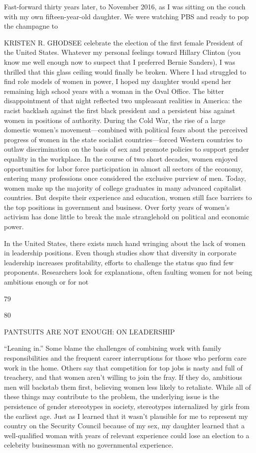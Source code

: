  \par 
Fast-forward thirty years later, to November 2016, as I was sitting on the couch with my own fifteen-year-old daughter. We were watching PBS and ready to pop the champagne to
 \par 
KRISTEN R. GHODSEE celebrate the election of the first female President of the United States. Whatever my personal feelings toward Hillary Clinton (you know me well enough now to suspect that I preferred Bernie Sanders), I was thrilled that this glass ceiling would finally be broken. Where I had struggled to find role models of women in power, I hoped my daughter would spend her remaining high school years with a woman in the Oval Office. The bitter disappointment of that night reflected two unpleasant realities in America: the racist backlash against the first black president and a persistent bias against women in positions of authority. During the Cold War, the rise of a large domestic women’s movement—combined with political fears about the perceived progress of women in the state socialist countries—forced Western countries to outlaw discrimination on the basis of sex and promote policies to support gender equality in the workplace. In the course of two short decades, women enjoyed opportunities for labor force participation in almost all sectors of the economy, entering many professions once considered the exclusive purview of men. Today, women make up the majority of college graduates in many advanced capitalist countries. But despite their experience and education, women still face barriers to the top positions in government and business. Over forty years of women’s activism has done little to break the male stranglehold on political and economic power.
 \par 
In the United States, there exists much hand wringing about the lack of women in leadership positions. Even though studies show that diversity in corporate leadership increases profitability, efforts to challenge the status quo find few proponents. Researchers look for explanations, often faulting women for not being ambitious enough or for not
 \par 
79
 \par 
80
 \par 
PANTSUITS ARE NOT ENOUGH: ON LEADERSHIP
 \par 
“Leaning in.” Some blame the challenges of combining work with family responsibilities and the frequent career interruptions for those who perform care work in the home. Others say that competition for top jobs is nasty and full of treachery, and that women aren't willing to join the fray. If they do, ambitious men will backstab them first, believing women less likely to retaliate. While all of these things may contribute to the problem, the underlying issue is the persistence of gender stereotypes in society, stereotypes internalized by girls from the earliest age. Just as I learned that it wasn’t plausible for me to represent my country on the Security Council because of my sex, my daughter learned that a well-qualified woman with years of relevant experience could lose an election to a celebrity businessman with no governmental experience.
